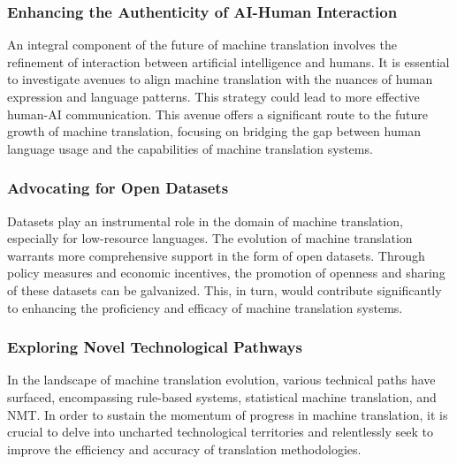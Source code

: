 \documentclass[acmsmall]{acmart}
\begin{document}
\subsubsection{Enhancing the Authenticity of AI-Human Interaction}
An integral component of the future of machine translation involves the refinement of interaction between artificial intelligence and humans. It is essential to investigate avenues to align machine translation with the nuances of human expression and language patterns. This strategy could lead to more effective human-AI communication. This avenue offers a significant route to the future growth of machine translation, focusing on bridging the gap between human language usage and the capabilities of machine translation systems.

\subsubsection{Advocating for Open Datasets}
Datasets play an instrumental role in the domain of machine translation, especially for low-resource languages. The evolution of machine translation warrants more comprehensive support in the form of open datasets. Through policy measures and economic incentives, the promotion of openness and sharing of these datasets can be galvanized. This, in turn, would contribute significantly to enhancing the proficiency and efficacy of machine translation systems.

\subsubsection{Exploring Novel Technological Pathways}
In the landscape of machine translation evolution, various technical paths have surfaced, encompassing rule-based systems, statistical machine translation, and NMT. In order to sustain the momentum of progress in machine translation, it is crucial to delve into uncharted technological territories and relentlessly seek to improve the efficiency and accuracy of translation methodologies.
\end{document}
